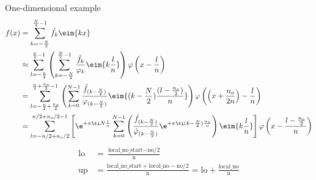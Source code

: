 \documentclass[a4paper,11pt,final,openright,headsepline]{scrreprt}
\numberwithin{figure}{chapter}
\numberwithin{table}{chapter}
\numberwithin{equation}{chapter}
\begin{document}
One-dimensional example
\begin{align*}
  f(x)
  &=
    \sum_{k=-\frac{N}{2}}^{\frac{N}{2}-1} \hat f_k \eim{kx} \\
  &\approx
    \sum_{l=-\frac{n}{2}}^{\frac{n}{2}-1}\left( \sum_{k=-\frac{N}{2}}^{\frac{N}{2}-1} \frac{\hat f_k}{\varphi_k} \eim{k\frac{l}{n}} \right) \varphi\left(x-\frac{l}{n}\right) \\
  &=
    \sum_{l=-\frac{n}{2}+\frac{n_o}{2}}^{\frac{n}{2}+\frac{n_o}{2}-1} \left(
      \sum_{k=0}^{N-1} \frac{\hat f_{(k-\frac{N}{2})}}{\varphi_{(k-\frac{N}{2})}} \eim{(k-\frac{N}{2})\frac{(l-\frac{n_o}{2})}{n}}
    \right) \varphi\left( \left(x+\frac{n_o}{2n}\right)-\frac{l}{n}\right) \\
  &=
    \sum_{l=-n/2+n_o/2}^{n/2+n_o/2-1} \left[
      \e^{+\pi\ti N\frac{l}{n}} \sum_{k=0}^{N-1} \left(
        \frac{\hat f_{(k-\frac{N}{2})}}{\hat\varphi_{(k-\frac{N}{2})}}
        \e^{+\pi\ti(k-\frac{N}{2})\frac{n_o}{n}}
      \right)
      \eim{k\frac{l}{n}}
    \right] \varphi\left( x-\frac{l-\frac{n_o}{2}}{n} \right)
\end{align*}
\begin{align*}
  \textrm{lo}
  &=
    \frac{\textrm{local\_no\_start} - \textrm{no/2}}{\textrm{n}} \\
  \textrm{up}
  &=
    \frac{\textrm{local\_no\_start} + \textrm{local\_no} - \textrm{no/2}}{\textrm{n}}
  =
    \textrm{lo} + \frac{\textrm{local\_no}}{\textrm{n}}
\end{align*}





% 

\end{document}
